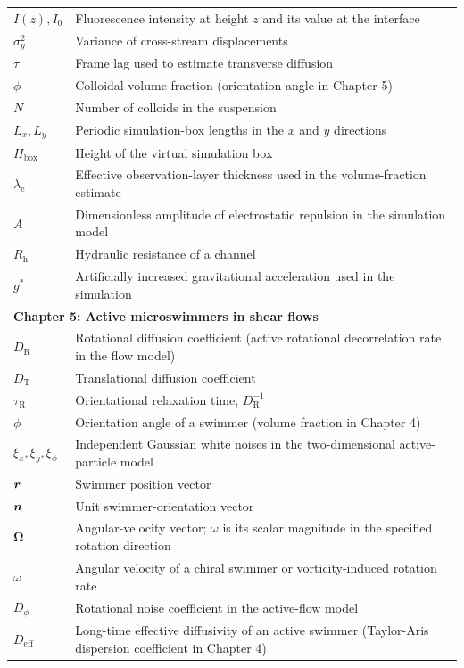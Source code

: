 \begin{longtable}{p{3cm}p{11cm}}
$I(z),I_0$ & Fluorescence intensity at height $z$ and its value at the interface \\
$\sigma_y^2$ & Variance of cross-stream displacements \\
$\tau$ & Frame lag used to estimate transverse diffusion \\
$\phi$ & Colloidal volume fraction (orientation angle in Chapter 5) \\
$N$ & Number of colloids in the suspension \\
$L_x,L_y$ & Periodic simulation-box lengths in the $x$ and $y$ directions \\
$H_\mathrm{box}$ & Height of the virtual simulation box \\
$\lambda_\mathrm{e}$ & Effective observation-layer thickness used in the volume-fraction estimate \\
$A$ & Dimensionless amplitude of electrostatic repulsion in the simulation model \\
$R_\mathrm{h}$ & Hydraulic resistance of a channel \\
$g^*$ & Artificially increased gravitational acceleration used in the simulation \\
\hline
\multicolumn{2}{l}{\textbf{Chapter 5: Active microswimmers in shear flows}}\\
$D_\mathrm{R}$ & Rotational diffusion coefficient (active rotational decorrelation rate in the flow model) \\
$D_\mathrm{T}$ & Translational diffusion coefficient \\
$\tau_\mathrm{R}$ & Orientational relaxation time, $D_\mathrm{R}^{-1}$ \\
$\phi$ & Orientation angle of a swimmer (volume fraction in Chapter 4) \\
$\xi_x,\xi_y,\xi_\phi$ & Independent Gaussian white noises in the two-dimensional active-particle model \\
$\bm{r}$ & Swimmer position vector \\
$\bm{n}$ & Unit swimmer-orientation vector \\
$\boldsymbol\Omega$ & Angular-velocity vector; $\omega$ is its scalar magnitude in the specified rotation direction \\
$\omega$ & Angular velocity of a chiral swimmer or vorticity-induced rotation rate \\
$D_\phi$ & Rotational noise coefficient in the active-flow model \\
$D_\mathrm{eff}$ & Long-time effective diffusivity of an active swimmer (Taylor-Aris dispersion coefficient in Chapter 4) \\

\end{longtable}
